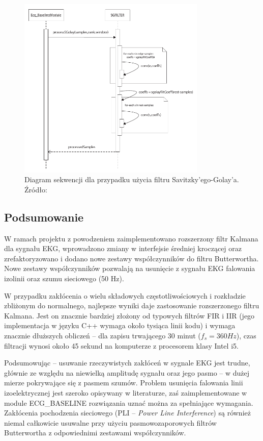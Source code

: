 \begin{figure}[H]
\centering
	\includegraphics[width=0.8\textwidth]{ECG_BASELINE/figures/sg_seq.pdf}
\caption{Diagram sekwencji dla przypadku użycia filtru Savitzky'ego-Golay'a. Źródło: \cite{Baseline2013}}
\label{MA-seq}
\end{figure}




\subsection{Podsumowanie}
W ramach projektu z powodzeniem zaimplementowano rozszerzony filtr Kalmana dla sygnału EKG, wprowadzono zmiany w interfejsie średniej kroczącej oraz zrefaktoryzowano i dodano nowe zestawy współczynników do filtru Butterwortha. Nowe zestawy współczynników pozwalają na usunięcie z sygnału EKG falowania izolinii oraz szumu sieciowego (50 Hz). 

W przypadku zakłócenia o wielu składowych częstotliwościowych i rozkładzie zbliżonym do normalnego, najlepsze wyniki daje zastosowanie rozszerzonego filtru Kalmana. Jest on znacznie bardziej złożony od typowych filtrów FIR i IIR (jego implementacja w języku C++ wymaga około tysiąca linii kodu) i wymaga znacznie dłuższych obliczeń -- dla zapisu trwającego 30 minut ($f_s = 360 Hz$), czas filtracji wynosi około 45 sekund na komputerze z procesorem klasy Intel i5.

Podsumowując -- usuwanie rzeczywistych zakłóceń w sygnale EKG jest trudne, głównie ze względu na niewielką amplitudę sygnału oraz jego pasmo -- w dużej mierze pokrywające się z pasmem szumów. Problem usunięcia falowania linii izoelektrycznej jest szeroko opisywany w literaturze, zaś zaimplementowane w module ECG\_BASELINE rozwiązania uznać można za spełniające wymagania. Zakłócenia pochodzenia sieciowego (PLI -- \emph{Power Line Interference}) są również niemal całkowicie usuwalne przy użyciu pasmowozaporowych filtrów Butterwortha z odpowiednimi zestawami współczynników. 
